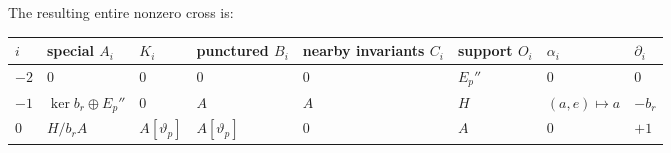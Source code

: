 The resulting entire nonzero cross is:

{\def\LTcaptype{none} %
\begin{longtable}[]{@{}
  >{\raggedright\arraybackslash}p{}
  >{\raggedright\arraybackslash}p{}
  >{\raggedright\arraybackslash}p{}
  >{\raggedright\arraybackslash}p{}
  >{\raggedright\arraybackslash}p{}
  >{\raggedright\arraybackslash}p{}
  >{\raggedright\arraybackslash}p{}
  >{\raggedright\arraybackslash}p{}@{}}
\toprule\noalign{}
\begin{minipage}[b]{\linewidth}\raggedright
\(i\)
\end{minipage} & \begin{minipage}[b]{\linewidth}\raggedright
special \(A_i\)
\end{minipage} & \begin{minipage}[b]{\linewidth}\raggedright
\(K_i\)
\end{minipage} & \begin{minipage}[b]{\linewidth}\raggedright
punctured \(B_i\)
\end{minipage} & \begin{minipage}[b]{\linewidth}\raggedright
nearby invariants \(C_i\)
\end{minipage} & \begin{minipage}[b]{\linewidth}\raggedright
support \(O_i\)
\end{minipage} & \begin{minipage}[b]{\linewidth}\raggedright
\(\alpha_i\)
\end{minipage} & \begin{minipage}[b]{\linewidth}\raggedright
\(\partial_i\)
\end{minipage} \\
\midrule\noalign{}
\endhead
\bottomrule\noalign{}
\endlastfoot
\(-2\) & \(0\) & \(0\) & \(0\) & \(0\) & \(E_p''\) & \(0\) & \(0\) \\
\(-1\) & \(\ker b_r\oplus E_p''\) & \(0\) & \(A\) & \(A\) & \(H\) &
\((a,e)\mapsto a\) & \(-b_r\) \\
\(0\) & \(H/b_rA\) & \(A[\vartheta_p]\) & \(A[\vartheta_p]\) & \(0\) &
\(A\) & \(0\) & \(+1\) \\
\end{longtable}
}

